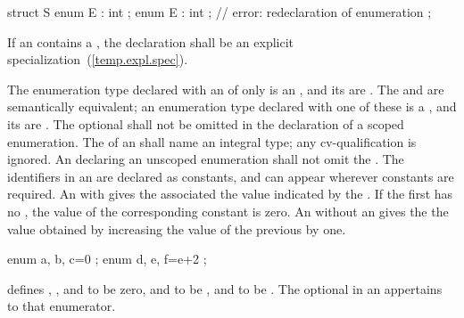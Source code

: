 \begin{codeblock}
   struct S {
     enum E : int {};
     enum E : int {};  // error: redeclaration of enumeration
   };
\end{codeblock}

\exitexample
\exitnote
If an  contains
a ,
the declaration shall be an explicit specialization~(\ref{temp.expl.spec}).

\pnum
{}%
%
%
%
The enumeration type declared with an 
of only  is an ,
and its  are .
The   and
 are semantically equivalent; an enumeration
type declared with one of these is a ,
and its  are .
The optional  shall not be omitted in the declaration of a scoped enumeration.
The  of an 
shall name an integral type; any cv-qualification is ignored.
An  declaring an unscoped enumeration shall
not omit the .
The identifiers in an  are declared as
constants, and can appear wherever constants are required.
%
An  with \tcode{=} gives the associated
 the value indicated by the
.
If the first 
has no , the value of the corresponding constant
is zero. An  without an
 gives the  the value
obtained by increasing the value of the previous 
by one.
\enterexample

\begin{codeblock}
enum { a, b, c=0 };
enum { d, e, f=e+2 };
\end{codeblock}

defines , , and  to be zero,  and
 to be , and  to be .
\exitexample
The optional  in an
 appertains to that enumerator.

